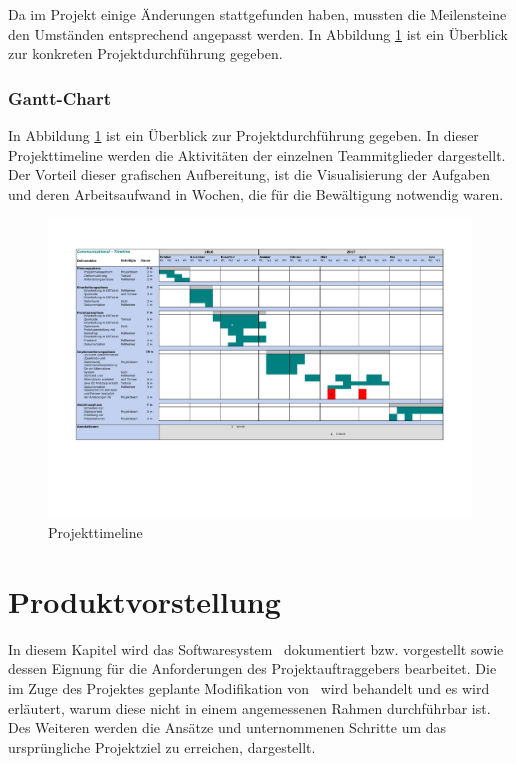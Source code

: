 Da im Projekt einige Änderungen stattgefunden haben, mussten die Meilensteine den Umständen entsprechend angepasst werden. In Abbildung \ref{Abb_Projekt_Timeline_Gantt} ist ein Überblick zur konkreten Projektdurchführung gegeben.

\subsection{Gantt-Chart}
In Abbildung \ref{Abb_Projekt_Timeline_Gantt} ist ein Überblick zur Projektdurchführung gegeben. In dieser Projekttimeline werden die Aktivitäten der einzelnen Teammitglieder dargestellt. Der Vorteil dieser grafischen Aufbereitung, ist die Visualisierung der Aufgaben und deren Arbeitsaufwand in Wochen, die für die Bewältigung notwendig waren.

\newpage
\begin{landscape}
	\begin{figure}[h]
		\centering
		\includegraphics[scale=.86]{figures/Timeline.pdf}
		\caption{Projekttimeline}
		\label{Abb_Projekt_Timeline_Gantt}
	\end{figure}
\end{landscape}

\chapter{Produktvorstellung}
In diesem Kapitel wird das Softwaresystem \getOst\ dokumentiert bzw. vorgestellt sowie dessen Eignung für die Anforderungen des Projektauftraggebers bearbeitet. Die im Zuge des Projektes geplante Modifikation von \getOst\ wird behandelt und es wird erläutert, warum diese nicht in einem angemessenen Rahmen durchführbar ist. Des Weiteren werden die Ansätze und unternommenen Schritte um das ursprüngliche Projektziel zu erreichen, dargestellt.

